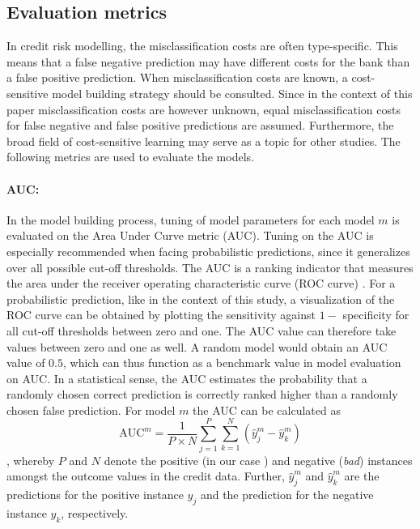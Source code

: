 \documentclass[12pt]{article}
\begin{document}
\subsection{Evaluation metrics}\label{metrics}
In credit risk modelling, the misclassification costs are often type-specific. This means that a false negative prediction may have different costs for the bank than a false positive prediction. When misclassification costs are known, a cost-sensitive model building strategy should be consulted. Since in the context of this paper misclassification costs are however unknown, equal misclassification costs for false negative and false positive predictions are assumed. Furthermore, the broad field of cost-sensitive learning may serve as a topic for other studies. The following metrics are used to evaluate the models.

\paragraph{AUC:} In the model building process, tuning of model parameters for each model $m$ is evaluated on the Area Under Curve metric (AUC). Tuning on the AUC is especially recommended when facing probabilistic predictions, since it generalizes over all possible cut-off thresholds. The AUC is a ranking indicator that measures the area under the receiver operating characteristic curve (ROC curve) \citep{hanley1982meaning}. For a probabilistic prediction, like in the context of this study, a visualization of the ROC curve can be obtained by plotting the sensitivity against $1 -$ specificity for all cut-off thresholds between zero and one. The AUC value can therefore take values between zero and one as well. A random model would obtain an AUC value of $0.5$, which can thus function as a benchmark value in model evaluation on AUC. In a statistical sense, the AUC estimates the probability that a randomly chosen correct prediction is correctly ranked higher than a randomly chosen false prediction. For model $m$ the AUC can be calculated as
\begin{equation}
\text{AUC}^m = \frac{1}{P \times N}\sum_{j=1}^{P}\sum_{k=1}^{N}(\hat{y}^m_j - \hat{y}^m_k)
\end{equation}
, whereby $P$ and $N$ denote the positive (in our case ) and negative (\textit{bad}) instances amongst the outcome values in the credit data. Further, $\hat{y}^m_j$ and $\hat{y}^m_k$ are the predictions for the positive instance $y_j$ and the prediction for the negative instance $y_k$, respectively.
\end{document}
